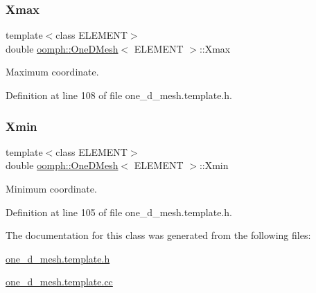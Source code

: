 \mbox{\label{classoomph_1_1OneDMesh_ac625d93f5299895ad5801918a20aea31}} 
\subsubsection{\texorpdfstring{Xmax}{Xmax}}
{\footnotesize\ttfamily template$<$class E\+L\+E\+M\+E\+NT$>$ \\
double \hyperlink{classoomph_1_1OneDMesh}{oomph\+::\+One\+D\+Mesh}$<$ E\+L\+E\+M\+E\+NT $>$\+::Xmax\hspace{0.3cm}{\ttfamily [protected]}}



Maximum coordinate. 



Definition at line 108 of file one\+\_\+d\+\_\+mesh.\+template.\+h.

\mbox{\label{classoomph_1_1OneDMesh_ab1c25c2437f203dd1f6d42ec0613e6a1}} 
\subsubsection{\texorpdfstring{Xmin}{Xmin}}
{\footnotesize\ttfamily template$<$class E\+L\+E\+M\+E\+NT$>$ \\
double \hyperlink{classoomph_1_1OneDMesh}{oomph\+::\+One\+D\+Mesh}$<$ E\+L\+E\+M\+E\+NT $>$\+::Xmin\hspace{0.3cm}{\ttfamily [protected]}}



Minimum coordinate. 



Definition at line 105 of file one\+\_\+d\+\_\+mesh.\+template.\+h.



The documentation for this class was generated from the following files\+:\begin{DoxyCompactItemize}
\item 
\hyperlink{one__d__mesh_8template_8h}{one\+\_\+d\+\_\+mesh.\+template.\+h}\item 
\hyperlink{one__d__mesh_8template_8cc}{one\+\_\+d\+\_\+mesh.\+template.\+cc}\end{DoxyCompactItemize}
